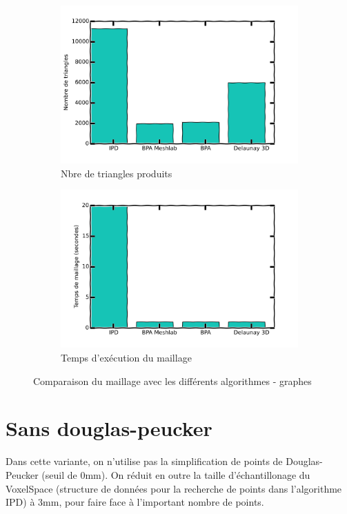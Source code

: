 \documentclass[a4paper,10pt]{report}
\begin{document}
\begin{figure}[h!]
	\centering
    \begin{subfigure}[b]{0.4\textwidth}
	    \includegraphics[width=\textwidth]{results/algos-triangles-cmp.png}
        \caption{Nbre de triangles produits}
    \end{subfigure}
    \begin{subfigure}[b]{0.4\textwidth}
	    \includegraphics[width=\textwidth]{results/algos-time-cmp.png}
        \caption{Temps d'exécution du maillage}
    \end{subfigure}
    \caption{\label{fig:meshgraph} Comparaison du maillage avec les différents algorithmes - graphes}
\end{figure}

\section{Sans douglas-peucker}
Dans cette variante, on n'utilise pas la simplification de points de Douglas-Peucker (seuil de 0mm). On réduit en outre la taille d'échantillonage du VoxelSpace (structure de données pour la recherche de points dans l'algorithme IPD) à 3mm, pour faire face à l'important nombre de points.
\end{document}
